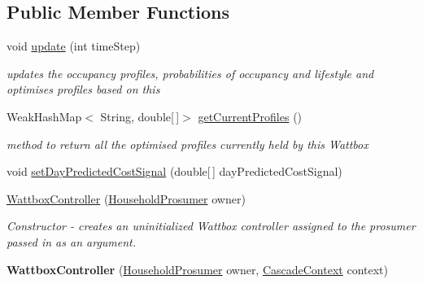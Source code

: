 \subsection*{Public Member Functions}
\begin{DoxyCompactItemize}
\item 
\hypertarget{classuk_1_1ac_1_1dmu_1_1iesd_1_1cascade_1_1controllers_1_1_wattbox_controller_a43eba22dbcf324720c569fad3a6df487}{void \hyperlink{classuk_1_1ac_1_1dmu_1_1iesd_1_1cascade_1_1controllers_1_1_wattbox_controller_a43eba22dbcf324720c569fad3a6df487}{update} (int time\-Step)}\label{classuk_1_1ac_1_1dmu_1_1iesd_1_1cascade_1_1controllers_1_1_wattbox_controller_a43eba22dbcf324720c569fad3a6df487}

\begin{DoxyCompactList}\small\item\em updates the occupancy profiles, probabilities of occupancy and lifestyle and optimises profiles based on this \end{DoxyCompactList}\item 
\hypertarget{classuk_1_1ac_1_1dmu_1_1iesd_1_1cascade_1_1controllers_1_1_wattbox_controller_aa824703749fe806d5462f70259a27d10}{Weak\-Hash\-Map$<$ String, double\mbox{[}$\,$\mbox{]}$>$ \hyperlink{classuk_1_1ac_1_1dmu_1_1iesd_1_1cascade_1_1controllers_1_1_wattbox_controller_aa824703749fe806d5462f70259a27d10}{get\-Current\-Profiles} ()}\label{classuk_1_1ac_1_1dmu_1_1iesd_1_1cascade_1_1controllers_1_1_wattbox_controller_aa824703749fe806d5462f70259a27d10}

\begin{DoxyCompactList}\small\item\em method to return all the optimised profiles currently held by this Wattbox \end{DoxyCompactList}\item 
void \hyperlink{classuk_1_1ac_1_1dmu_1_1iesd_1_1cascade_1_1controllers_1_1_wattbox_controller_aad0999e5fa1e9070d340bc39b000d83f}{set\-Day\-Predicted\-Cost\-Signal} (double\mbox{[}$\,$\mbox{]} day\-Predicted\-Cost\-Signal)
\item 
\hyperlink{classuk_1_1ac_1_1dmu_1_1iesd_1_1cascade_1_1controllers_1_1_wattbox_controller_a4dfdd37a5e9c2bef2957d4fa3bb0f3e7}{Wattbox\-Controller} (\hyperlink{classuk_1_1ac_1_1dmu_1_1iesd_1_1cascade_1_1agents_1_1prosumers_1_1_household_prosumer}{Household\-Prosumer} owner)
\begin{DoxyCompactList}\small\item\em Constructor -\/ creates an uninitialized Wattbox controller assigned to the prosumer passed in as an argument. \end{DoxyCompactList}\item 
\hypertarget{classuk_1_1ac_1_1dmu_1_1iesd_1_1cascade_1_1controllers_1_1_wattbox_controller_a495e87bc3da1b52674a8fc38e235e089}{{\bfseries Wattbox\-Controller} (\hyperlink{classuk_1_1ac_1_1dmu_1_1iesd_1_1cascade_1_1agents_1_1prosumers_1_1_household_prosumer}{Household\-Prosumer} owner, \hyperlink{classuk_1_1ac_1_1dmu_1_1iesd_1_1cascade_1_1context_1_1_cascade_context}{Cascade\-Context} context)}\label{classuk_1_1ac_1_1dmu_1_1iesd_1_1cascade_1_1controllers_1_1_wattbox_controller_a495e87bc3da1b52674a8fc38e235e089}


\end{DoxyCompactItemize}

